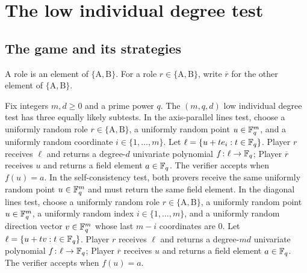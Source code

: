 \chapter{The low individual degree test}
\label{chap:test}
\label{sec:the-test}

\section{The game and its strategies}

\begin{definition}[Roles]\label{def:roles}
	\leanok
	A role is an element of $\{\mathrm A,\mathrm B\}$. For a role $r \in \{\mathrm A,\mathrm B\}$, write $\overline r$ for the other element of $\{\mathrm A,\mathrm B\}$.
\end{definition}

\begin{definition}\label{def:low-individual-degree-test}
	\leanok
	Fix integers $m,d \ge 0$ and a prime power $q$. The $(m,q,d)$ low individual degree test has three equally likely subtests.
	In the axis-parallel lines test, choose a uniformly random role $r \in \{\mathrm A,\mathrm B\}$, a uniformly random point $u \in \mathbb{F}_q^m$, and a uniformly random coordinate $i \in \{1,\dots,m\}$. Let $\ell=\{u+t e_i : t \in \mathbb{F}_q\}$. Player $r$ receives $\ell$ and returns a degree-$d$ univariate polynomial $f\colon \ell \to \mathbb{F}_q$; Player $\overline r$ receives $u$ and returns a field element $a \in \mathbb{F}_q$. The verifier accepts when $f(u)=a$.
	In the self-consistency test, both provers receive the same uniformly random point $u \in \mathbb{F}_q^m$ and must return the same field element.
	In the diagonal lines test, choose a uniformly random role $r \in \{\mathrm A,\mathrm B\}$, a uniformly random point $u \in \mathbb{F}_q^m$, a uniformly random index $i \in \{1,\dots,m\}$, and a uniformly random direction vector $v \in \mathbb{F}_q^m$ whose last $m-i$ coordinates are $0$. Let $\ell=\{u+t v : t \in \mathbb{F}_q\}$. Player $r$ receives $\ell$ and returns a degree-$md$ univariate polynomial $f\colon \ell \to \mathbb{F}_q$; Player $\overline r$ receives $u$ and returns a field element $a \in \mathbb{F}_q$. The verifier accepts when $f(u)=a$.
\end{definition}

